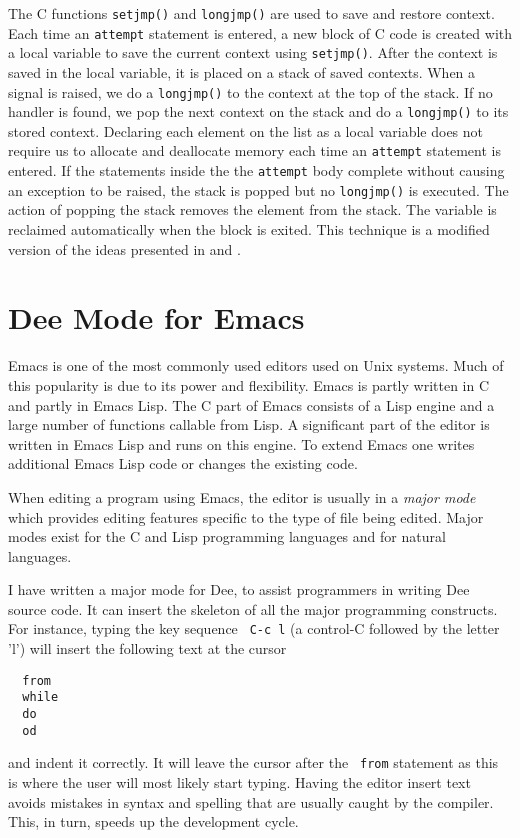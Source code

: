 The C functions {\tt setjmp()} and {\tt longjmp()} are used to save
and restore context.  Each time an {\tt attempt} statement is entered,
a new block of C code is created with a local variable to save the
current context using {\tt setjmp()}.  After the context is saved in
the local variable, it is placed on a stack of saved contexts.  When a
signal is raised, we do a {\tt longjmp()} to the context at the top of
the stack.  If no handler is found, we pop the next context on the
stack and do a {\tt longjmp()} to its stored context.  Declaring each
element on the list as a local variable does not require us to
allocate and deallocate memory each time an {\tt attempt} statement is
entered.  If the statements inside the the {\tt attempt} body complete
without causing an exception to be raised, the stack is popped but no
{\tt longjmp()} is executed.  The action of popping the stack removes
the element from the stack.  The variable is reclaimed automatically
when the block is exited.  This technique is a modified version of the
ideas presented in \cite{Dony90} and \cite{Amsterdam91}.

\section{Dee Mode for Emacs} \label{dee-mode}

Emacs is one of the most commonly used editors used on Unix systems.
Much of this popularity is due to its power and flexibility.  Emacs is
partly written in C and partly in Emacs Lisp.  The C part of Emacs
consists of a Lisp engine and a large number of functions callable
from Lisp.  A significant part of the editor is written in Emacs Lisp
and runs on this engine.  To extend Emacs one writes additional Emacs
Lisp code or changes the existing code.

When editing a program using Emacs, the editor is usually in a {\em
major mode} which provides editing features specific to the type of
file being edited.  Major modes exist for the C and Lisp programming
languages and for natural languages.

I have written a major mode for Dee, to assist programmers in writing
Dee source code.  It can insert the skeleton of all the major
programming constructs.  For instance, typing the key sequence {\tt
C-c l} (a control-C followed by the letter 'l') will insert the
following text at the cursor
\vspace{8mm}
\begin{verbatim} 
  from
  while
  do
  od
\end{verbatim}
\vspace{8mm}
and indent it correctly.  It will leave the cursor after the {\tt
from} statement as this is where the user will most likely start
typing. Having the editor insert text avoids mistakes in syntax and
spelling that are usually caught by the compiler.  This, in turn,
speeds up the development cycle.

